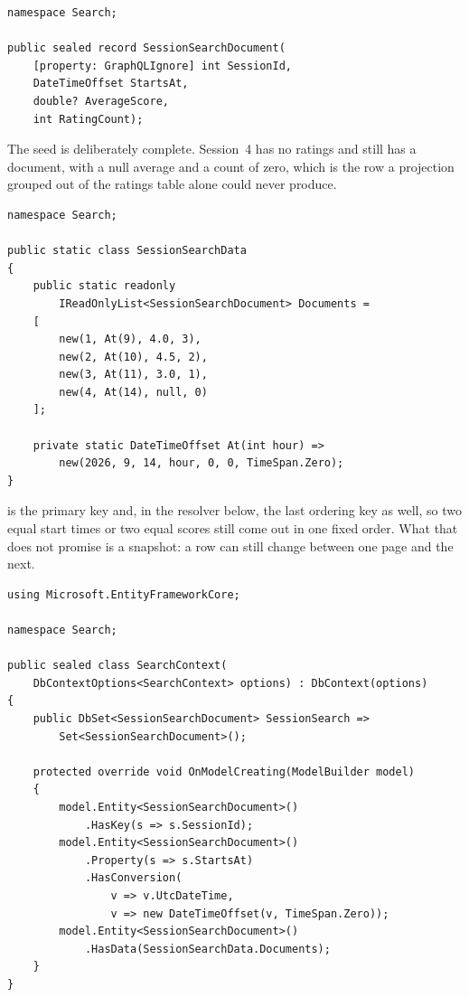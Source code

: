 \begin{verbatim}
namespace Search;

public sealed record SessionSearchDocument(
    [property: GraphQLIgnore] int SessionId,
    DateTimeOffset StartsAt,
    double? AverageScore,
    int RatingCount);
\end{verbatim}

%
The seed is deliberately complete. Session~4 has no ratings and still has a
document, with a null average and a count of zero, which is the row a
projection grouped out of the ratings table alone could never produce.

\begin{verbatim}
namespace Search;

public static class SessionSearchData
{
    public static readonly
        IReadOnlyList<SessionSearchDocument> Documents =
    [
        new(1, At(9), 4.0, 3),
        new(2, At(10), 4.5, 2),
        new(3, At(11), 3.0, 1),
        new(4, At(14), null, 0)
    ];

    private static DateTimeOffset At(int hour) =>
        new(2026, 9, 14, hour, 0, 0, TimeSpan.Zero);
}
\end{verbatim}

%
 is the primary key and, in the resolver below, the last
ordering key as well, so two equal start times or two equal scores still come
out in one fixed order. What that does not promise is a snapshot: a row can
still change between one page and the next.

\begin{verbatim}
using Microsoft.EntityFrameworkCore;

namespace Search;

public sealed class SearchContext(
    DbContextOptions<SearchContext> options) : DbContext(options)
{
    public DbSet<SessionSearchDocument> SessionSearch =>
        Set<SessionSearchDocument>();

    protected override void OnModelCreating(ModelBuilder model)
    {
        model.Entity<SessionSearchDocument>()
            .HasKey(s => s.SessionId);
        model.Entity<SessionSearchDocument>()
            .Property(s => s.StartsAt)
            .HasConversion(
                v => v.UtcDateTime,
                v => new DateTimeOffset(v, TimeSpan.Zero));
        model.Entity<SessionSearchDocument>()
            .HasData(SessionSearchData.Documents);
    }
}
\end{verbatim}

